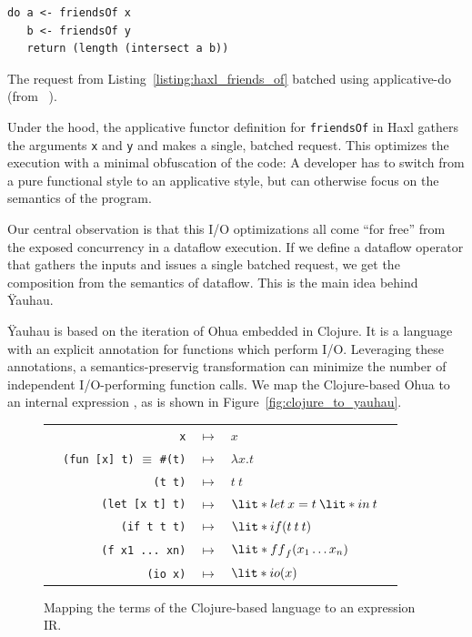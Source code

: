 \begin{listing}
\begin{verbatim}
do a <- friendsOf x
   b <- friendsOf y
   return (length (intersect a b))
\end{verbatim}
\caption{The request from Listing~\ref{listing:haxl_friends_of} batched using applicative-do (from ~\cite{marlow2014haxl}).}
\label{listing:haxl_applicative_do}
\end{listing}

Under the hood, the applicative functor definition for \texttt{friendsOf} in Haxl gathers the arguments \texttt{x} and \texttt{y} and makes a single, batched request.
This optimizes the execution with a minimal obfuscation of the code:
A developer has to switch from a pure functional style to an applicative style, but can otherwise focus on the semantics of the program.

Our central observation is that this \ac{I/O} optimizations all come ``for free'' from the exposed concurrency in a dataflow execution. 
If we define a dataflow operator that gathers the inputs and issues a single batched request, we get the composition from the semantics of dataflow.
This is the main idea behind \"{Y}auhau.


\"{Y}auhau is based on the iteration of Ohua embedded in Clojure.
It is a language with an explicit annotation for functions which perform \ac{I/O}.
Leveraging these annotations, a semantics-preservig transformation can minimize the number of independent \ac{I/O}-performing function calls.
We map the Clojure-based Ohua to an internal expression , as is shown in Figure~\ref{fig:clojure_to_yauhau}.

\begin{figure}[h]
	\centering
	\begin{tabular}{r r c l r}
		&\texttt{x} & $\mapsto$ & $x$ & \\
		&\texttt{(fun [x] t)} $\equiv$ \texttt{#(t)} & $\mapsto$ & $\lambda x.t$ & \\
		&\texttt{(t t)} & $\mapsto$ & $t \: t$ & \\
		&\texttt{(let [x t] t)} & $\mapsto$ & $\lit*{let} \: x = t \: \lit*{in} \: t$ & \\
		&\texttt{(if t t t)} & $\mapsto$ & $\lit*{if}(t \: t \: t)$  &\\
		&\texttt{(f x1 ... xn)} & $\mapsto$ & $\lit*{ff}_f(x_1 \ldots x_n)$ & \\
		&\texttt{(io x)}&$\mapsto$& $\lit*{io}(x)$ & \\
	\end{tabular}
	
	\caption{Mapping the terms of the Clojure-based language to an expression \acs{IR}.}
	\label{fig:clojure_to_yauau}
\end{figure}

